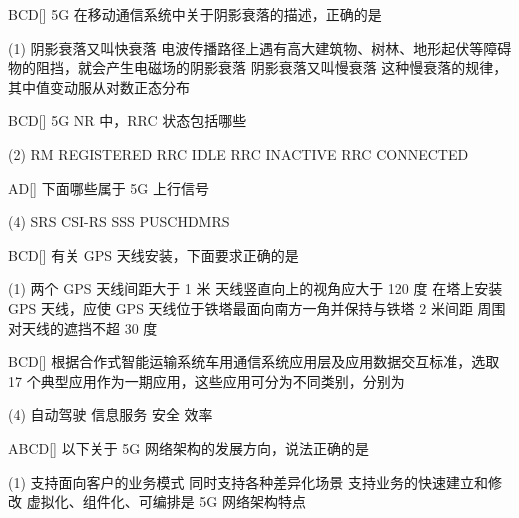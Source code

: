 \begin{choice}{\;BCD\;}[]
    5G 在移动通信系统中关于阴影衰落的描述，正确的是
    \begin{tasks}(1)
        \task 阴影衰落又叫快衰落
        \task 电波传播路径上遇有高大建筑物、树林、地形起伏等障碍物的阻挡，就会产生电磁场的阴影衰落
        \task 阴影衰落又叫慢衰落
        \task 这种慢衰落的规律，其中值变动服从对数正态分布
    \end{tasks}
\end{choice}

\begin{choice}{\;BCD\;}[]
    5G NR 中，RRC 状态包括哪些
    \begin{tasks}(2)
        \task RM REGISTERED
        \task RRC IDLE
        \task RRC INACTIVE
        \task RRC CONNECTED
    \end{tasks}
\end{choice}

\begin{choice}{\;AD\;}[]
    下面哪些属于 5G 上行信号
    \begin{tasks}(4)
        \task SRS
        \task CSI-RS
        \task  SSS
        \task PUSCH\;DMRS
    \end{tasks}
\end{choice}


\begin{choice}{\;BCD\;}[]
    有关 GPS 天线安装，下面要求正确的是
    \begin{tasks}(1)
        \task 两个 GPS 天线间距大于 1 米
        \task 天线竖直向上的视角应大于 120 度
        \task 在塔上安装 GPS 天线，应使 GPS 天线位于铁塔最面向南方一角并保持与铁塔 2 米间距
        \task 周围对天线的遮挡不超 30 度
    \end{tasks}
\end{choice}


\begin{choice}{\;BCD\;}[]
    根据合作式智能运输系统车用通信系统应用层及应用数据交互标准，选取 17 个典型应用作为一期应用，这些应用可分为不同类别，分别为
    \begin{tasks}(4)
        \task 自动驾驶
        \task 信息服务
        \task 安全
        \task  效率
    \end{tasks}
\end{choice}


\begin{choice}{\;ABCD\;}[]
    以下关于 5G 网络架构的发展方向，说法正确的是
    \begin{tasks}(1)
        \task 支持面向客户的业务模式
        \task 同时支持各种差异化场景
        \task 支持业务的快速建立和修改
        \task 虚拟化、组件化、可编排是 5G 网络架构特点
    \end{tasks}
\end{choice}


